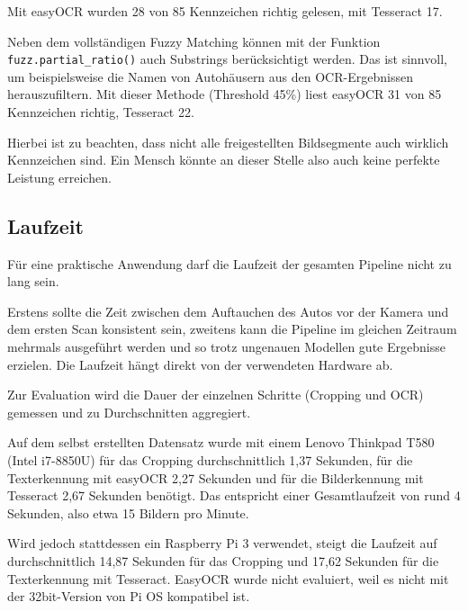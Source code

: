 Mit easyOCR wurden 28 von 85 Kennzeichen richtig gelesen, mit Tesseract 17.

Neben dem vollständigen Fuzzy Matching können mit der Funktion \lstinline{fuzz.partial_ratio()} auch Substrings berücksichtigt werden.
Das ist sinnvoll, um beispielsweise die Namen von Autohäusern aus den OCR-Ergebnissen herauszufiltern.
Mit dieser Methode (Threshold 45\%) liest easyOCR 31 von 85 Kennzeichen richtig, Tesseract 22.


Hierbei ist zu beachten, dass nicht alle freigestellten Bildsegmente auch wirklich Kennzeichen sind. Ein Mensch könnte an dieser Stelle also auch keine perfekte Leistung erreichen. 

\subsection{Laufzeit}

Für eine praktische Anwendung darf die Laufzeit der gesamten Pipeline nicht zu lang sein.

Erstens sollte die Zeit zwischen dem Auftauchen des Autos vor der Kamera und dem ersten Scan konsistent sein,
zweitens kann die Pipeline im gleichen Zeitraum mehrmals ausgeführt werden und so trotz ungenauen Modellen gute Ergebnisse erzielen.
Die Laufzeit hängt direkt von der verwendeten Hardware ab.

Zur Evaluation wird die Dauer der einzelnen Schritte (Cropping und OCR) gemessen und zu Durchschnitten aggregiert.

Auf dem selbst erstellten Datensatz wurde mit einem Lenovo Thinkpad T580 (Intel i7-8850U) für das Cropping durchschnittlich 1,37 Sekunden,
für die Texterkennung mit easyOCR 2,27 Sekunden und für die Bilderkennung mit Tesseract 2,67 Sekunden benötigt.
Das entspricht einer Gesamtlaufzeit von rund 4 Sekunden, also etwa 15 Bildern pro Minute.

Wird jedoch stattdessen ein Raspberry Pi 3 verwendet, steigt die Laufzeit auf durchschnittlich 14,87 Sekunden für das Cropping und 17,62 Sekunden für die Texterkennung mit Tesseract.
EasyOCR wurde nicht evaluiert, weil es nicht mit der 32bit-Version von Pi OS kompatibel ist.
